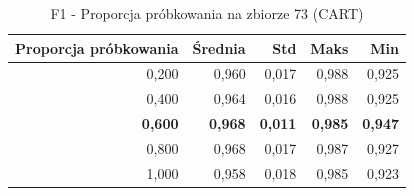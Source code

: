 \begin{table}[htbp]
\centering
\small
\setlength{\tabcolsep}{6pt}
\renewcommand{\arraystretch}{1.2}
\caption{F1 - Proporcja próbkowania na zbiorze 73 (CART)}
\label{tab:CART_sample_ratio_73_f1}
\begin{tabular}{r|r|r|r|r}
\toprule
Proporcja próbkowania & Średnia & Std & Maks & Min \\
\hline
0,200 & 0,960 & 0,017 & 0,988 & 0,925 \\
0,400 & 0,964 & 0,016 & 0,988 & 0,925 \\
\textbf{0,600} & \textbf{0,968} & \textbf{0,011} & \textbf{0,985} & \textbf{0,947} \\
0,800 & 0,968 & 0,017 & 0,987 & 0,927 \\
1,000 & 0,958 & 0,018 & 0,985 & 0,923 \\
\bottomrule
\end{tabular}
\end{table}